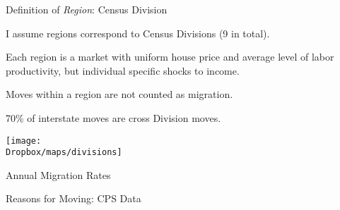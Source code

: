 \documentclass[12pt,english, aspectratio=169]{beamer}
\begin{document}
\begin{frame}{Definition of \emph{Region}: Census Division\hypertarget{Divisions}{}}

\begin{widei}
\item I assume regions correspond to Census Divisions (9 in total).
\item Each region is a market with uniform house price and average level
of labor productivity, but individual specific shocks to income.
\item Moves within a region are not counted as migration.
\item 70\% of interstate moves are cross Division moves.

\end{widei}
%
\end{frame}
\begin{frame}[plain]{}
\begin{adjustbox}{center}
\texttt{[image: \\Dropbox/maps/divisions]}\end{adjustbox}
\end{frame}






\begin{frame}{Annual Migration Rates}

\vspace{1cm}
\begin{table}
\begin{centering}

\par\end{centering}
\caption{\cite{molloy2011internal}}
\end{table}
\end{frame}

\begin{frame}{Reasons for Moving: CPS Data}

\begin{table}[p]
\begin{centering}

\par\end{centering}
\caption{CPS 2013 variable \texttt{NX1RES}: \emph{What was your main reason for moving to this house (apartment)?} Median distance moved is 1347 KM. }
\end{table}

\end{frame}
\end{document}
